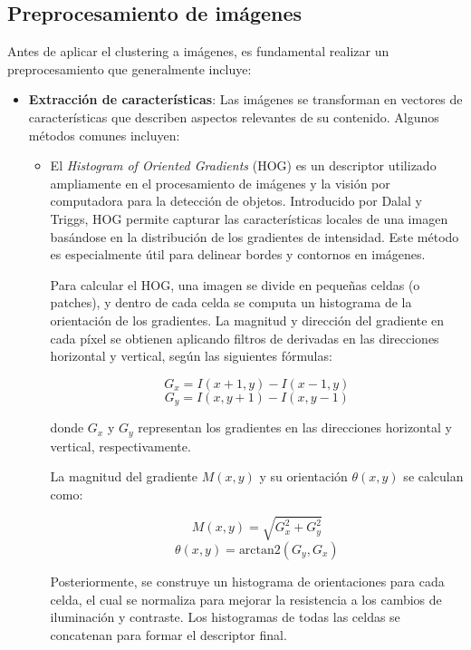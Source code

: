 \subsection{Preprocesamiento de imágenes}\label{sec:preprocesamiento_imagenes}
Antes de aplicar el clustering a imágenes, es fundamental realizar un preprocesamiento que generalmente incluye:

\begin{itemize}
    \item \textbf{Extracción de características}: Las imágenes se transforman en vectores de características que describen aspectos relevantes de su contenido. Algunos métodos comunes incluyen:
        \begin{itemize}
            \item El \textit{Histogram of Oriented Gradients} (HOG) es un descriptor utilizado ampliamente en el procesamiento de imágenes y la visión por computadora para la detección de objetos. Introducido por Dalal y Triggs, HOG permite capturar las características locales de una imagen basándose en la distribución de los gradientes de intensidad. Este método es especialmente útil para delinear bordes y contornos en imágenes.

            Para calcular el HOG, una imagen se divide en pequeñas celdas (o patches), y dentro de cada celda se computa un histograma de la orientación de los gradientes. La magnitud y dirección del gradiente en cada píxel se obtienen aplicando filtros de derivadas en las direcciones horizontal y vertical, según las siguientes fórmulas:
            
            \[G_x = I(x+1, y) - I(x-1, y)
            \]
            \[G_y = I(x, y+1) - I(x, y-1)
            \]

            donde \(G_x\) y \(G_y\) representan los gradientes en las direcciones horizontal y vertical, respectivamente.

            La magnitud del gradiente \(M(x, y)\) y su orientación \(\theta(x, y)\) se calculan como:

            \[M(x, y) = \sqrt{G_x^2 + G_y^2}
            \]
            \[\theta(x, y) = \text{arctan2}(G_y, G_x)
            \]

            Posteriormente, se construye un histograma de orientaciones para cada celda, el cual se normaliza para mejorar la resistencia a los cambios de iluminación y contraste. Los histogramas de todas las celdas se concatenan para formar el descriptor final.
            

\end{itemize}
\end{itemize}
